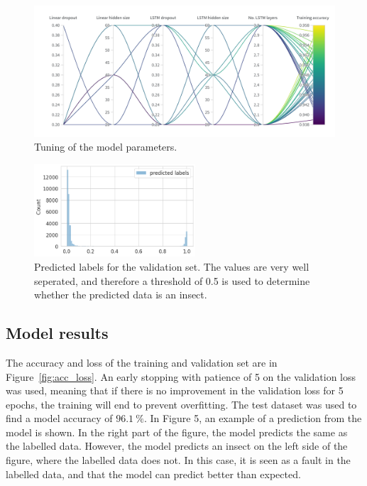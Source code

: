 \begin{figure}[htb]
  \centering
  \includegraphics[width=\textwidth]{Figures/model_tuning}
  \caption{Tuning of the model parameters.}
  \label{fig:tune-network}
\end{figure}

\begin{figure}[htb]
\begin{minipage}[b]{0.48\textwidth}
  \centering
  \includegraphics[width=6.0cm]{Figures/predicted_labels}
\end{minipage}
\caption{Predicted labels for the validation set. The values are very well seperated, and therefore a threshold of 0.5 is used to determine whether the predicted data is an insect.}
\label{fig:threshold}
\end{figure}

\subsection{Model results}
The accuracy and loss of the training and validation set are in Figure~\ref{fig:acc_loss}.
An early stopping with patience of 5 on the validation loss was used, meaning that if there is no improvement in the validation loss for 5 epochs, the training will end to prevent overfitting.
The test dataset was used to find a model accuracy of $96.1 \: \%$.
In Figure 5, an example of a prediction from the model is shown.
In the right part of the figure, the model predicts the same as the labelled data.
However, the model predicts an insect on the left side of the figure, where the labelled data does not.
In this case, it is seen as a fault in the labelled data, and that the model can predict better than expected.


